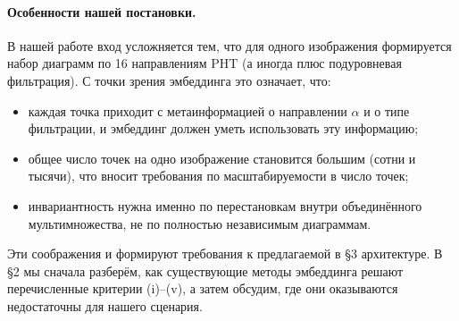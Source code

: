 \paragraph{Особенности нашей постановки.}
В нашей работе вход усложняется тем, что для одного изображения формируется набор диаграмм по 16 направлениям PHT (а иногда плюс подуровневая фильтрация). С точки зрения эмбеддинга это означает, что:
\begin{itemize}
\item каждая точка приходит с метаинформацией о направлении $\alpha$ и о типе фильтрации, и эмбеддинг должен уметь использовать эту информацию;
\item общее число точек на одно изображение становится большим (сотни и тысячи), что вносит требования по масштабируемости в число точек;
\item инвариантность нужна именно по перестановкам внутри объединённого мультимножества, не по полностью независимым диаграммам.
\end{itemize}
Эти соображения и формируют требования к предлагаемой в §3 архитектуре. В §2 мы сначала разберём, как существующие методы эмбеддинга решают перечисленные критерии (i)--(v), а затем обсудим, где они оказываются недостаточны для нашего сценария.
